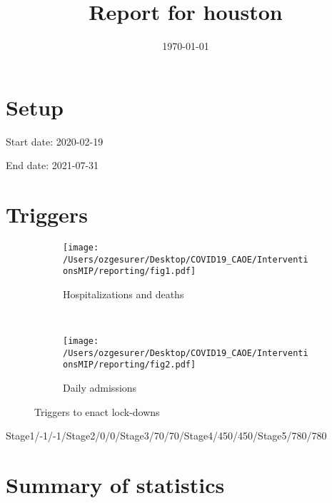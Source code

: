 \documentclass{article}
\title{Report for houston}
\author{}
\date{\today}
\begin{document}
\maketitle

\section*{Setup}

Start date: 2020-02-19

End date: 2021-07-31 




\section*{Triggers}
\begin{figure}[!htb]
  \centering
  \setlength{\unitlength}{1cm}
    \begin{subfigure}[b]{0.475\linewidth}
    \centering
        \texttt{[image: /Users/ozgesurer/Desktop/COVID19\_CAOE/InterventionsMIP/reporting/fig1.pdf]}
        \caption{Hospitalizations  and deaths}
        \label{fig:IHD}
    \end{subfigure}
    ~
    \begin{subfigure}[b]{0.475\linewidth}
    \centering
         \texttt{[image: /Users/ozgesurer/Desktop/COVID19\_CAOE/InterventionsMIP/reporting/fig2.pdf]}
        \caption{Daily admissions}
        \label{fig:IYIH}
    \end{subfigure}
    \caption{Triggers to enact lock-downs}\label{fig:SD90}
\end{figure}

Stage1/-1/-1/Stage2/0/0/Stage3/70/70/Stage4/450/450/Stage5/780/780

\newpage

\section*{Summary of statistics}
\end{document}
